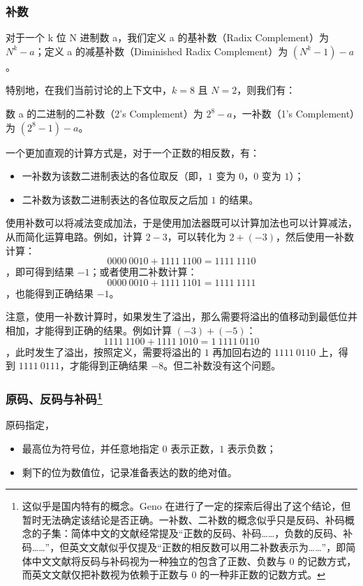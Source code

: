         \subsubsection{补数}\label{subsubsec:NumberSystemBasics/positional-notation-presentation/binary/complement}
            对于一个 k 位 N 进制数 a，我们定义 a 的基补数（Radix Complement）为 $N ^ k - a$；定义 a 的减基补数（Diminished Radix Complement）为 $(N ^ k - 1) - a$。

            特别地，在我们当前讨论的上下文中，$k = 8$ 且 $N = 2$，则我们有：

            数 a 的二进制的二补数（2's Complement）为 $2 ^ 8 - a$，一补数（1's Complement）为 $(2 ^ 8 - 1) - a$。

            一个更加直观的计算方式是，对于一个正数的相反数，有：
            \begin{itemize}
                \item 一补数为该数二进制表达的各位取反（即，$1$ 变为 $0$，$0$ 变为 $1$）；
                \item 二补数为该数二进制表达的各位取反之后加 $1$ 的结果。
            \end{itemize}

            使用补数可以将减法变成加法，于是使用加法器既可以计算加法也可以计算减法，从而简化运算电路。例如，计算 $2 - 3$，可以转化为 $2 + (-3)$，然后使用一补数计算：
            \[0000\ 0010 + 1111\ 1100 = 1111\ 1110\]
            ，即可得到结果 $-1$；或者使用二补数计算：
            \[0000\ 0010 + 1111\ 1101 = 1111\ 1111\]
            ，也能得到正确结果 $-1$。

            注意，使用一补数计算时，如果发生了溢出，那么需要将溢出的值移动到最低位并相加，才能得到正确的结果。例如计算 $(-3) + (-5)$：
            \[1111\ 1100 + 1111\ 1010 = 1\ 1111\ 0110\]
            ，此时发生了溢出，按照定义，需要将溢出的 $1$ 再加回右边的 $1111\ 0110$ 上，得到 $1111\ 0111$，才能得到正确结果 $-8$。但二补数没有这个问题。

        \subsubsection[原码、反码与补码]{原码、反码与补码\footnote{这似乎是国内特有的概念。Geno 在进行了一定的探索后得出了这个结论，但暂时无法确定该结论是否正确。一补数、二补数的概念似乎只是反码、补码概念的子集：简体中文的文献经常提及“正数的反码、补码……，负数的反码、补码……”，但英文文献似乎仅提及“正数的相反数可以用二补数表示为……”，即简体中文文献将反码与补码视为一种独立的包含了正数、负数与 $0$ 的记数方式，而英文文献仅把补数视为依赖于正数与 $0$ 的一种非正数的记数方式。}}\label{subsubsec:NumberSystemBasics/positional-notation-presentation/binary/chinese-only}
            原码指定，
            \begin{itemize}
                \item 最高位为符号位，并任意地指定 $0$ 表示正数，$1$ 表示负数；
                \item 剩下的位为数值位，记录准备表达的数的绝对值。
            \end{itemize}

